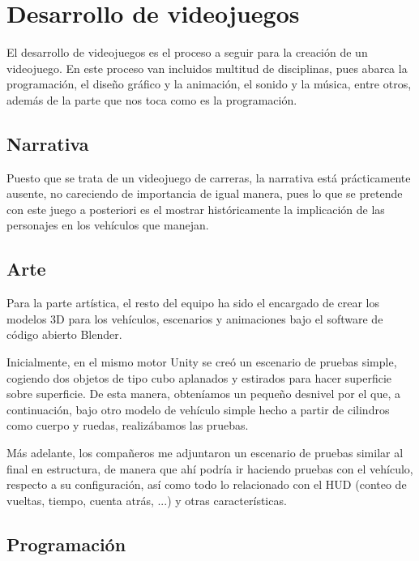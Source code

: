 
\section{Desarrollo de videojuegos}

El desarrollo de videojuegos es el proceso a seguir para la creación de un videojuego. En este proceso van incluidos multitud de disciplinas, pues abarca la programación, el diseño gráfico y la animación, el sonido y la música, entre otros, además de la parte que nos toca como es la programación.

\subsection{Narrativa}

Puesto que se trata de un videojuego de carreras, la narrativa está prácticamente ausente, no careciendo de importancia de igual manera, pues lo que se pretende con este juego a posteriori es el mostrar históricamente la implicación de las personajes en los vehículos que manejan.

\subsection{Arte}

Para la parte artística, el resto del equipo ha sido el encargado de crear los modelos 3D para los vehículos, escenarios y animaciones bajo el software de código abierto Blender. 

Inicialmente, en el mismo motor Unity se creó un escenario de pruebas simple, cogiendo dos objetos de tipo cubo aplanados y estirados para hacer superficie sobre superficie. De esta manera, obteníamos un pequeño desnivel por el que, a continuación, bajo otro modelo de vehículo simple hecho a partir de cilindros como cuerpo y ruedas, realizábamos las pruebas.

Más adelante, los compañeros me adjuntaron un escenario de pruebas similar al final en estructura, de manera que ahí podría ir haciendo pruebas con el vehículo, respecto a su configuración, así como todo lo relacionado con el HUD (conteo de vueltas, tiempo, cuenta atrás, ...) y otras características.

\subsection{Programación}

